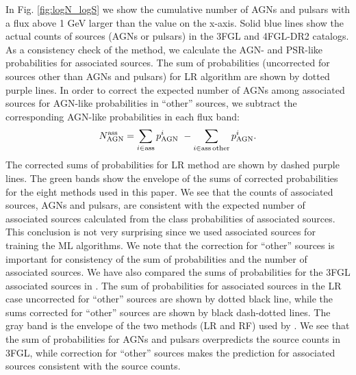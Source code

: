 \documentclass{aa}
\newcommand{\bea}{\begin{eqnarray}}
\newcommand{\eea}{\end{eqnarray}}
\newcommand{\lb}{\label}
\begin{document}
In Fig. \ref{fig:logN_logS} we show the cumulative number of AGNs and pulsars with a flux above 1 GeV larger than the
value on the x-axis.
Solid blue lines show the actual counts of sources (AGNs or pulsars) in the 3FGL and 4FGL-DR2 catalogs.
As a consistency check of the method, we calculate the AGN- and PSR-like probabilities for associated sources.
The sum of probabilities (uncorrected for sources other than AGNs and pulsars) for LR algorithm are shown by dotted purple lines.
In order to correct the expected number of AGNs among associated sources for AGN-like probabilities in ``other'' sources, 
we subtract the corresponding AGN-like probabilities in each flux band:
\bea
\lb{eq:assoc_ev}
N_{\rm AGN}^{\rm ass}  = \sum_{i \in \rm ass} p^i_{\rm AGN}\,\, - \sum_{i \in \rm ass\,other} p^i_{\rm AGN}.
\eea
The corrected sums of probabilities for LR method are shown by dashed purple lines.
The green bands show the envelope of the sums of corrected probabilities for the eight methods used in this paper.
We see that the counts of associated sources, AGNs and pulsars, are consistent with the expected number of associated sources
calculated from the class probabilities of associated sources.
This conclusion is not very surprising since we used associated sources for training the ML algorithms.
We note that the correction for ``other'' sources is important for consistency of the sum of probabilities and the number of associated sources.
We have also compared the sums of probabilities for the 3FGL associated sources in \cite{2016ApJ...820....8S}.
The sum of probabilities for associated sources in the LR case uncorrected for ``other'' sources are shown by dotted black line,
while the sums corrected for ``other'' sources are shown by black dash-dotted lines.
The gray band is the envelope of the two methods (LR and RF) used by \cite{2016ApJ...820....8S}.
We see that the sum of probabilities for AGNs and pulsars overpredicts the source counts in 3FGL, 
while correction for ``other'' sources makes the prediction for associated sources consistent with the source counts.
\end{document}
